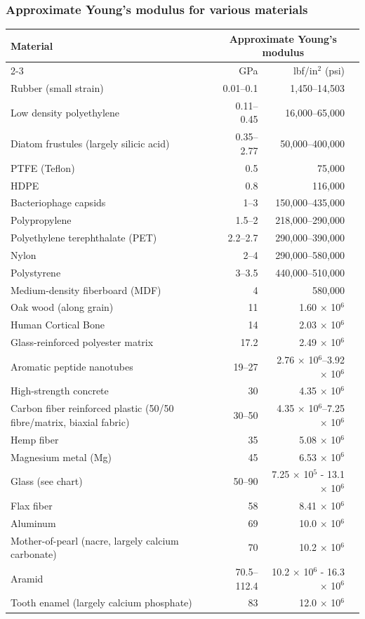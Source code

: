 \documentclass{beamer}
\begin{document}
\begin{frame}
\frametitle{Approximate Young’s modulus for various materials}

\tiny
\setlength\tabcolsep{2pt} %
\begin{tabular}{lrrr}
\toprule
Material & \multicolumn{2}{c}{Approximate Young's modulus} \\
\cmidrule(r){2-3} & GPa & lbf/in$^2$ (psi) \\
\midrule
Rubber (small strain) & 0.01–0.1 & 1,450–14,503 \\
Low density polyethylene & 0.11–0.45 & 16,000–65,000 \\
Diatom frustules (largely silicic acid) & 0.35–2.77 & 50,000–400,000 \\
PTFE (Teflon) & 0.5 & 75,000 \\
HDPE & 0.8 & 116,000 \\
Bacteriophage capsids & 1–3 & 150,000–435,000 \\
Polypropylene & 1.5–2 & 218,000–290,000 \\
Polyethylene terephthalate (PET) & 2.2–2.7 & 290,000–390,000 \\
Nylon & 2–4 & 290,000–580,000 \\
Polystyrene & 3–3.5 & 440,000–510,000 \\
Medium-density fiberboard (MDF) & 4 & 580,000 \\
Oak wood (along grain) & 11 & 1.60 $\times$ 10$^6$ \\
Human Cortical Bone & 14 & 2.03 $\times$ 10$^6$ \\
Glass-reinforced polyester matrix & 17.2 & 2.49 $\times$ 10$^6$ \\
Aromatic peptide nanotubes & 19–27 & 2.76 $\times$ 10$^6$–3.92 $\times$ 10$^6$ \\
High-strength concrete & 30 & 4.35 $\times$ 10$^6$ \\
Carbon fiber reinforced plastic (50/50 fibre/matrix, biaxial fabric) & 30–50 & 4.35 $\times$ 10$^6$–7.25 $\times$ 10$^6$ \\
Hemp fiber & 35 & 5.08 $\times$ 10$^6$ \\
Magnesium metal (Mg) & 45 & 6.53 $\times$ 10$^6$ \\
Glass (see chart) & 50–90 & 7.25 $\times$ 10$^5$ - 13.1 $\times$ 10$^6$ \\
Flax fiber & 58 & 8.41 $\times$ 10$^6$ \\
Aluminum & 69 & 10.0 $\times$ 10$^6$ \\
Mother-of-pearl (nacre, largely calcium carbonate) & 70 & 10.2 $\times$ 10$^6$ \\
Aramid & 70.5–112.4 & 10.2 $\times$ 10$^6$ - 16.3 $\times$ 10$^6$ \\
Tooth enamel (largely calcium phosphate) & 83 & 12.0 $\times$ 10$^6$ \\
\bottomrule
\end{tabular}

\end{frame}
\end{document}
